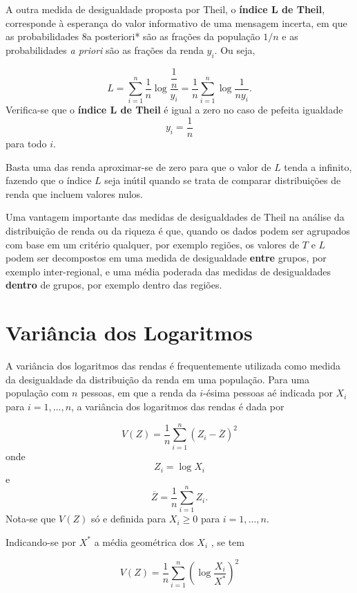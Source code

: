 \documentclass[
]{book}
\begin{document}
A outra medida de desigualdade proposta por Theil, o \textbf{índice L de Theil}, corresponde à esperança do valor informativo de uma mensagem incerta, em que as probabilidades 8a posteriori* são as frações da população \(1/n\) e as probabilidades \emph{a priori} são as frações da renda \(y_i\). Ou seja,

\[
  L = \sum_{i=1}^{n}\dfrac{1}{n} \log \dfrac{\dfrac{1}{n}}{y_i} = \dfrac{1}{n}\sum_{i=1}^{n} \log \dfrac{1}{ny_i}.
  \label{eq:IndiceLDeTheil}
\]
Verifica-se que o \textbf{índice L de Theil} é igual a zero no caso de pefeita igualdade
\[
  y_i = \dfrac{1}{n}
\]
para todo \(i\).

Basta uma das renda aproximar-se de zero para que o valor de \(L\) tenda a infinito, fazendo que o índice \(L\) seja inútil quando se trata de comparar distribuições de renda que incluem valores nulos.

Uma vantagem importante das medidas de desigualdades de Theil na análise da distribuição de renda ou da riqueza é que, quando os dados podem ser agrupados com base em um critério qualquer, por exemplo regiões, os valores de \(T\) e \(L\) podem ser decompostos em uma medida de desigualdade \textbf{entre} grupos, por exemplo inter-regional, e uma média poderada das medidas de desigualdades \textbf{dentro} de grupos, por exemplo dentro das regiões.

\hypertarget{variuxe2ncia-dos-logaritmos}{%
\section{Variância dos Logaritmos}\label{variuxe2ncia-dos-logaritmos}}

A variância dos logaritmos das rendas é frequentemente utilizada como medida da desigualdade da distribuição da renda em uma população. Para uma população com \(n\) pessoas, em que a renda da \(i\)-ésima pessoas aé indicada por \(X_i\) para \(i=1, \ldots, n\), a variância dos logaritmos das rendas é dada por

\[
V(Z) = \dfrac{1}{n} \sum_{i=1}^{n} \left( Z_i - \overline{Z} \right)^2 
\label{eq:VarianciaDosLogaritmos}
\]
onde
\[
Z_i = \log X_i
\]
e
\[
\overline{Z} = \dfrac{1}{n}\sum_{i=1}^{n} Z_i.
\]
Nota-se que \(V(Z)\) só e definida para \(X_i \geq 0\) para \(i=1, \ldots, n\).

Indicando-se por \(X^*\) a média geométrica dos \(X_i\) , se tem

\[
V(Z) = \dfrac{1}{n} \sum_{i=1}^{n} \left( \log \dfrac{X_i}{X^*} \right)^2
\label{eq:VarianciaDosLogaritmosComMediaGeometrica}
\]
\end{document}

